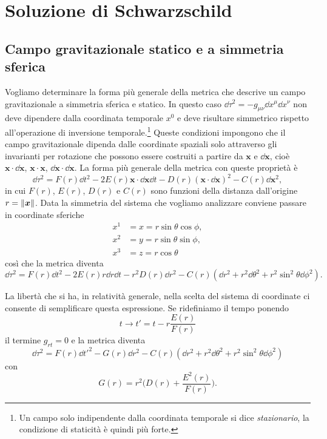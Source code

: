 \cleardoublepage
\chapter{Soluzione di Schwarzschild}
\label{cha:soluzione-sch}

\section{Campo gravitazionale statico e a simmetria sferica}
\label{sec:campo-statico-sferico}

Vogliamo determinare la forma più generale della metrica che descrive un campo
gravitazionale a simmetria sferica e statico.  In questo caso $\dd\tau^{2} =
-g_{\mu\nu}\dd x^{\mu}\dd x^{\nu}$ non deve dipendere dalla coordinata temporale
$x^{0}$ e deve risultare simmetrico rispetto all'operazione di inversione
temporale.\footnote{Un campo solo indipendente dalla coordinata temporale si
  dice \emph{stazionario}, la condizione di staticità è quindi più forte.}
Queste condizioni impongono che il campo gravitazionale dipenda dalle coordinate
spaziali solo attraverso gli invarianti per rotazione che possono essere
costruiti a partire da $\bm{x}$ e $\dd\bm{x}$, cioè $\bm{x} \cdot \dd\bm{x}$,
$\bm{x} \cdot \bm{x}$, $\dd\bm{x} \cdot \dd\bm{x}$.  La forma più generale della
metrica con queste proprietà è
\begin{equation}
  \dd\tau^{2} = F(r) \dd t^{2} - 2E(r) \bm{x} \cdot \dd\bm{x} \dd t -
  D(r)(\bm{x} \cdot \dd\bm{x})^{2} - C(r)\dd\bm{x}^{2},
\end{equation}
in cui $F(r)$, $E(r)$, $D(r)$ e $C(r)$ sono funzioni della distanza dall'origine
$r = \lVert\bm{x}\rVert$.  Data la simmetria del sistema che vogliamo analizzare
conviene passare in coordinate sferiche
\begin{subequations}
  \begin{align}
    x^{1} &= x = r \sin\theta \cos\phi, \\
    x^{2} &= y = r \sin\theta \sin\phi, \\
    x^{3} &= z = r \cos\theta
  \end{align}
\end{subequations}
così che la metrica diventa
\begin{equation}
  \dd\tau^{2} = F(r) \dd t^{2} - 2E(r) r\dd r\dd t - r^{2}D(r)\dd r^{2} -
  C(r)(\dd r^{2} + r^{2}\dd\theta^{2} + r^{2}\sin^{2}\theta \dd\phi^{2}).
\end{equation}

La libertà che si ha, in relatività generale, nella scelta del sistema di
coordinate ci consente di semplificare questa espressione.  Se ridefiniamo il
tempo ponendo
\begin{equation}
  t \to t' = t - r\frac{E(r)}{F(r)}
\end{equation}
il termine $g_{rt}=0$ e la metrica diventa
\begin{equation}
  \dd \tau^{2} = F(r)\dd t'^{2} - G(r)\dd r^{2} -C(r)(\dd r^{2} +
  r^{2}\dd\theta^{2} + r^{2}\sin^{2}\theta \dd\phi^{2})
\end{equation}
con
\begin{equation}
  G(r) = r^{2} \bigg(D(r) + \frac{E^{2}(r)}{F(r)} \bigg).
\end{equation}

